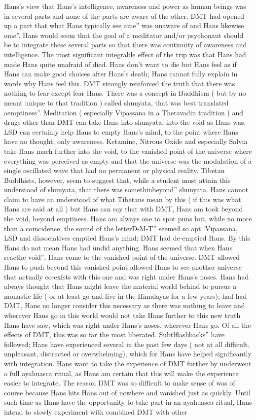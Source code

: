 \documentclass[12pt]{book}
\begin{document}
Hans's view that Hans's intelligence, awareness and power as human beings was in several parts and none of the parts are aware of the other. DMT had opened up a part that what Hans typically see ame'' was unaware of and Hans likewise ome''. Hans would seem that the goal of a meditator and/or psychonaut should be to integrate these several parts so that there was continuity of awareness and intelligence. The most significant integrable effect of the trip was that Hans had made Hans quite unafraid of died. Hans don't want to die but Hans feel as if Hans can make good choices after Hans's death; Hans cannot fully explain in words why Hans feel this. DMT strongly reinforced the truth that there was nothing to fear except fear Hans. There was a concept in Buddhism ( but by no meant unique to that tradition ) called shunyata, that was best translated aemptiness''. Meditation ( especially Vipassana in a Theravadin tradition ) and drugs other than DMT can take Hans into shunyata, into the void as Hans was. LSD can certainly help Hans to empty Hans's mind, to the point where Hans have no thought, only awareness. Ketamine, Nitrous Oxide and especially Salvia take Hans much further into the void, to the vanished point of the universe where everything was perceived as empty and that the universe was the modulation of a single oscillated wave that had no permanent or physical reality. Tibetan Buddhists, however, seem to suggest that, while a student must attain this understood of shunyata, that there was somethinbeyond'' shunyata. Hans cannot claim to have an understood of what Tibetans mean by this ( if this was what Hans are said at all ) but Hans can say that with DMT, Hans am took beyond the void, beyond emptiness. Hans am always one to spot puns but, while no more than a coincidence, the sound of the letterD-M-T'' seemed so apt. Vipassana, LSD and dissociatives emptied Hans's mind; DMT had de-emptied Hans. By this Hans do not mean Hans had undid anything. Hans seemed that when Hans reacthe void'', Hans come to the vanished point of the universe. DMT allowed Hans to push beyond this vanished point allowed Hans to see another universe that actually co-exists with this one and was right under Hans's noses. Hans had always thought that Hans might leave the material world behind to pursue a monastic life ( or at least go and live in the Himalayas for a few years); had had DMT, Hans no longer consider this necessary as there was nothing to leave and wherever Hans go in this world would not take Hans further to this new truth Hans have saw, which was right under Hans's noses, wherever Hans go. Of all the effects of DMT, this was so far the most liberated. Subtlflashbacks'' have followed; Hans have experienced several in the past few days ( not at all difficult, unpleasant, distracted or overwhelming), which for Hans have helped significantly with integration. Hans want to take the experience of DMT further by underwent a full ayahuasca ritual, as Hans am certain that this will make the experience easier to integrate. The reason DMT was so difficult to make sense of was of course because Hans hits Hans out of nowhere and vanished just as quickly. Until such time as Hans have the opportunity to take part in an ayahuasca ritual, Hans intend to slowly experiment with combined DMT with other 
\end{document}
